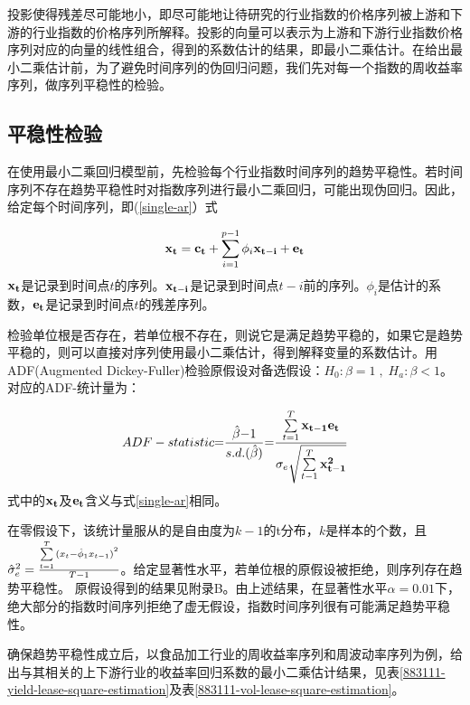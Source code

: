 \documentclass{sysuthesis}
\begin{document}
投影使得残差尽可能地小，即尽可能地让待研究的行业指数的价格序列被上游和下游的行业指数的价格序列所解释。投影的向量可以表示为上游和下游行业指数价格序列对应的向量的线性组合，得到的系数估计的结果，即最小二乘估计。在给出最小二乘估计前，为了避免时间序列的伪回归问题，我们先对每一个指数的周收益率序列，做序列平稳性的检验。

\subsection{平稳性检验}
在使用最小二乘回归模型前，先检验每个行业指数时间序列的趋势平稳性。若时间序列不存在趋势平稳性时对指数序列进行最小二乘回归，可能出现伪回归。因此，给定每个时间序列，即(\ref{single-ar}）式

\begin{equation}
\label{single-ar} 
{\bf {x_t}} = {\bf {c_t}} + \sum\limits_{i = 1}^{p - 1} {{\phi _i}{\bf{x_{t - i}}} + {\bf {e_t}}}
\end{equation}
${\bf {x_t}}$是记录到时间点$t$的序列。${\bf{x_{t - i}}}$是记录到时间点$t-i$前的序列。${\phi _i}$是估计的系数，${\bf {e_t}}$是记录到时间点$t$的残差序列。

检验单位根是否存在，若单位根不存在，则说它是满足趋势平稳的，如果它是趋势平稳的，则可以直接对序列使用最小二乘估计，得到解释变量的系数估计。用ADF(Augmented Dickey-Fuller)检验原假设对备选假设：${H_0}:\beta  = 1\;,\;{H_a}:\beta  < 1$\cite{tsay2013multivariate}。对应的ADF-统计量为：

\begin{equation}
\label{adf-calculation}
ADF - statistic{\rm{ = }}\frac{{\hat \beta {\rm{ - 1}}}}{{s.d.(\hat \beta )}}{\rm{ = }}\frac{{\sum\limits_{t = 1}^T {{\bf{x_{t - 1}}}{\bf {e_t}}} }}{{{\sigma _e}\sqrt {\sum\limits_{t{\rm{ - }}1}^T {\bf{x_{t - 1}^2} }} }}
\end{equation}
式中的${\bf {x_t}}$及${\bf {e_t}}$含义与式\ref{single-ar}相同。

在零假设下，该统计量服从的是自由度为$k-1$的t分布，$k$是样本的个数，且$\hat \sigma _e^{\rm{2}} = \frac{{\sum\limits_{t = 1}^T {{{({x_t} - {{\hat \phi }_1}{x_{t - 1}})}^2}} }}{{T - 1}}$。给定显著性水平，若单位根的原假设被拒绝，则序列存在趋势平稳性。
原假设得到的结果见附录B。由上述结果，在显著性水平$\alpha=0.01$下，绝大部分的指数时间序列拒绝了虚无假设，指数时间序列很有可能满足趋势平稳性。

确保趋势平稳性成立后，以食品加工行业的周收益率序列和周波动率序列为例，给出与其相关的上下游行业的收益率回归系数的最小二乘估计结果，见表\ref{883111-yield-lease-square-estimation}及表\ref{883111-vol-lease-square-estimation}。
\end{document}
